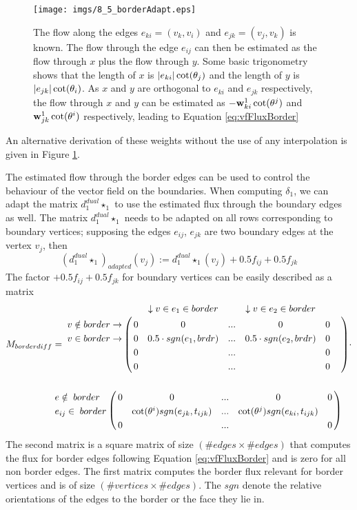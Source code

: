 \begin{figure}
\begin{center}
\texttt{[image: imgs/8\_5\_borderAdapt.eps]}
\end{center}
\caption{The flow along the edges $e_{ki}= (v_k,v_i)$ and $e_{jk} = (v_j, v_k)$ is known. The flow through the edge $e_{ij}$ can then be estimated as the flow through $x$ plus the flow through $y$. Some basic trigonometry shows that the length of $x$ is $\left| e_{ki} \right|\cot(\theta_j)$ and the length of $y$ is $\left| e_{jk} \right|\cot(\theta_i)$. As $x$ and $y$ are orthogonal to $e_{ki}$ and $e_{jk}$ respectively, the flow through $x$ and $y$ can be estimated as $-\textbf{w}^1_{ki} \cot(\theta^j)$ and $\textbf{w}^1_{jk} \cot(\theta^i)$ respectively, leading to Equation \ref{eq:vfFluxBorder}}
\label{fig:8_3_borderWeights}
\end{figure}

An alternative derivation of these weights without the use of any interpolation is given in Figure \ref{fig:8_3_borderWeights}.

The estimated flow through the border edges can be used to control the behaviour of the vector field on the boundaries. When computing $\delta_1$, we can adapt the matrix $d_1^{dual} \star_1$ to use the estimated flux through the boundary edges as well.  The matrix $d_1^{dual} \star_1$ needs to be adapted on all rows corresponding to boundary vertices; supposing the edges $e_{ij}$, $e_{jk}$ are two boundary edges at the vertex $v_j$, then
\[(d_1^{dual} \star_1)_{adapted} (v_j) := d_1^{dual} \star_1(v_j) + 0.5 f_{ij} + 0.5 f_{jk}\]
The factor $+ 0.5 f_{ij} + 0.5 f_{jk}$ for boundary vertices can be easily described as a matrix
\begin{align*}M_{borderdiff}& = \bordermatrix{ 
& & \downarrow v \in e_1 \in border & &\downarrow v\in e_{2} \in border& & \cr
v \notin border \rightarrow & 0 & 0& ...& 0& 0 \cr
v\in border \rightarrow & 0 & 0.5 \cdot sgn(e_{1}, brdr) & ... & 0.5 \cdot sgn(e_{2}, brdr)&0\cr
& 0 & & ...& & 0 \cr
& 0 & & ...& & 0
} \cdot \nonumber \\
& \bordermatrix{ 
& & & & &\cr
e \notin \; border & 0 & 0 & ...&0 & 0 \cr
e_{ij} \in\;border& & \cot(\theta^i)sgn(e_{jk}, t_{ijk}) & ... & \cot(\theta^j)sgn(e_{ki}, t_{ijk}) & \cr
& 0 & & ...& & 0
}\end{align*}
The second matrix is a square matrix of size $(\# edges \times \# edges)$ that computes the flux for border edges following Equation \ref{eq:vfFluxBorder} and is zero for all non border edges. The first matrix computes the border flux relevant for border vertices and is of size $(\#vertices \times \#edges)$. The $sgn$ denote the relative orientations of the edges to the border or the face they lie in.

